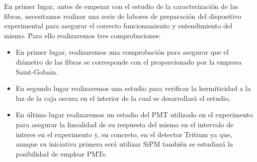 En primer lugar, antes de empezar con el estudio de la caracterización de las fibras, necesitamos realizar una serie de labores de preparación del dispositivo experimental para asegurar el correcto funcionamiento y entendimiento del mismo. Para ello realizaremos tres comprobaciones:
\begin{itemize}
\item{} En primer lugar, realizaremos una comprobación para asegurar que el diámetro de las fibras se corresponde con el proporcionado por la empresa Saint-Gobain.

\item{} En segundo lugar realizaremos una estudio para verificar la hermiticidad a la luz de la caja oscura en el interior de la cual se desarrollará el estudio.

\item{} En último lugar realizaremos un estudio del PMT utilizado en el experimento para asegurar la linealidad de su respuesta del mismo en el intervalo de interes en el experimento y, en concreto, en el detector Tritium ya que, aunque su iniciativa primera será utilizar SiPM también se estudiará la posibilidad de emplear PMTs.
\end{itemize}